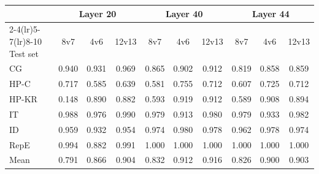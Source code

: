 \begin{tabular}{lccccccccc}
\toprule
 & \multicolumn{3}{c}{Layer 20} & \multicolumn{3}{c}{Layer 40} & \multicolumn{3}{c}{Layer 44} \\
\cmidrule(lr){2-4}\cmidrule(lr){5-7}\cmidrule(lr){8-10}
Test set & 8v7 & 4v6 & 12v13 & 8v7 & 4v6 & 12v13 & 8v7 & 4v6 & 12v13 \\
\midrule
CG & 0.940 & 0.931 & 0.969 & 0.865 & 0.902 & 0.912 & 0.819 & 0.858 & 0.859 \\
HP-C & 0.717 & 0.585 & 0.639 & 0.581 & 0.755 & 0.712 & 0.607 & 0.725 & 0.712 \\
HP-KR & 0.148 & 0.890 & 0.882 & 0.593 & 0.919 & 0.912 & 0.589 & 0.908 & 0.894 \\
IT & 0.988 & 0.976 & 0.990 & 0.979 & 0.913 & 0.980 & 0.979 & 0.933 & 0.982 \\
ID & 0.959 & 0.932 & 0.954 & 0.974 & 0.980 & 0.978 & 0.962 & 0.978 & 0.974 \\
RepE & 0.994 & 0.882 & 0.991 & 1.000 & 1.000 & 1.000 & 1.000 & 1.000 & 1.000 \\
\midrule
Mean & 0.791 & 0.866 & 0.904 & 0.832 & 0.912 & 0.916 & 0.826 & 0.900 & 0.903 \\
\bottomrule
\end{tabular}